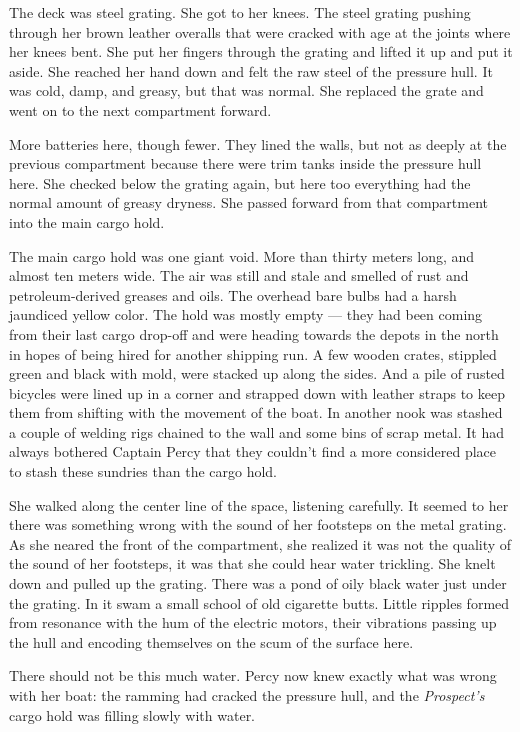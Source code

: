 \documentclass[]{article}
\begin{document}
The deck was steel grating. She got to her knees. The steel grating
pushing through her brown leather overalls that were cracked with age at
the joints where her knees bent. She put her fingers through the grating
and lifted it up and put it aside. She reached her hand down and felt
the raw steel of the pressure hull. It was cold, damp, and greasy, but
that was normal. She replaced the grate and went on to the next
compartment forward.

More batteries here, though fewer. They lined the walls, but not as
deeply at the previous compartment because there were trim tanks inside
the pressure hull here. She checked below the grating again, but here
too everything had the normal amount of greasy dryness. She passed
forward from that compartment into the main cargo hold.

The main cargo hold was one giant void. More than thirty meters long,
and almost ten meters wide. The air was still and stale and smelled of
rust and petroleum-derived greases and oils. The overhead bare bulbs had
a harsh jaundiced yellow color. The hold was mostly empty --- they had
been coming from their last cargo drop-off and were heading towards the
depots in the north in hopes of being hired for another shipping run. A
few wooden crates, stippled green and black with mold, were stacked up
along the sides. And a pile of rusted bicycles were lined up in a corner
and strapped down with leather straps to keep them from shifting with
the movement of the boat. In another nook was stashed a couple of
welding rigs chained to the wall and some bins of scrap metal. It had
always bothered Captain Percy that they couldn't find a more considered
place to stash these sundries than the cargo hold.

She walked along the center line of the space, listening carefully. It
seemed to her there was something wrong with the sound of her footsteps
on the metal grating. As she neared the front of the compartment, she
realized it was not the quality of the sound of her footsteps, it was
that she could hear water trickling. She knelt down and pulled up the
grating. There was a pond of oily black water just under the grating. In
it swam a small school of old cigarette butts. Little ripples formed
from resonance with the hum of the electric motors, their vibrations
passing up the hull and encoding themselves on the scum of the surface
here.

There should not be this much water. Percy now knew exactly what was
wrong with her boat: the ramming had cracked the pressure hull, and the
\emph{Prospect's} cargo hold was filling slowly with water.
\end{document}
